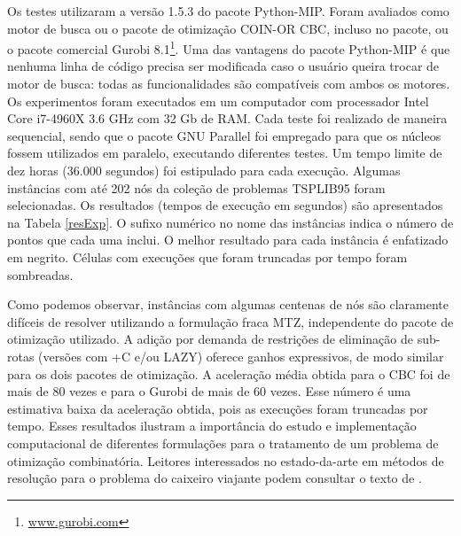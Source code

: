 \documentclass[a4paper,11pt,fleqn]{article}
\begin{document}
Os testes utilizaram a versão 1.5.3 do pacote Python-MIP. Foram avaliados como motor de busca ou o pacote de otimização COIN-OR CBC, incluso no pacote, ou o pacote comercial Gurobi 8.1\footnote{\url{www.gurobi.com}}. 
Uma das vantagens do pacote Python-MIP é que nenhuma linha de código precisa ser modificada caso o usuário queira trocar de motor de busca: todas as funcionalidades são compatíveis com ambos os motores. 
Os experimentos foram executados em um computador com processador Intel Core i7-4960X 3.6 GHz com 32 Gb de RAM. 
Cada teste foi realizado de maneira sequencial, sendo que o pacote GNU Parallel \citep{Tange2011} foi empregado para que os núcleos fossem utilizados em paralelo, executando diferentes testes. 
Um tempo limite de dez horas (36.000 segundos) foi estipulado para cada execução. 
Algumas instâncias com até 202 nós da coleção de problemas TSPLIB95 \citep{Reinelt95} foram selecionadas. 
Os resultados (tempos de execução em segundos) são apresentados na Tabela \ref{resExp}. O sufixo numérico no nome das instâncias indica o número de pontos que cada uma inclui. O melhor resultado para cada instância é enfatizado em negrito. Células com execuções que foram truncadas por tempo foram sombreadas.
    
Como podemos observar, instâncias com algumas centenas de nós são claramente difíceis de resolver utilizando a formulação fraca MTZ, independente do pacote de otimização utilizado. A adição por demanda de restrições de eliminação de sub-rotas (versões com +C e/ou LAZY) oferece ganhos expressivos, de modo similar para os dois pacotes de otimização. A aceleração média obtida para o CBC foi de mais de 80 vezes e para o Gurobi de mais de 60 vezes. Esse número é uma estimativa baixa da aceleração obtida, pois as execuções foram truncadas por tempo. Esses resultados ilustram a importância do estudo e implementação computacional de diferentes formulações para o tratamento de um problema de otimização combinatória. Leitores interessados no estado-da-arte em métodos de resolução para o problema do caixeiro viajante podem consultar o texto de \cite{Cook2019}.
\end{document}
